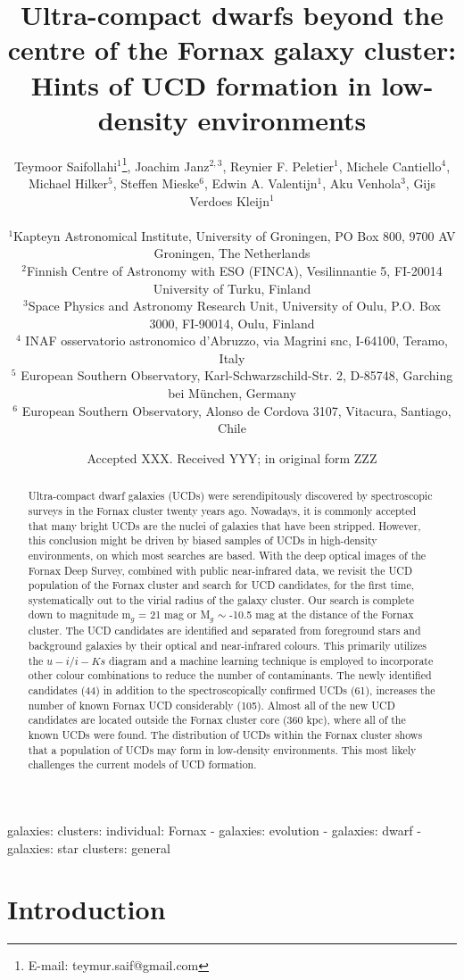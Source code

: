\documentclass[fleqn,usenatbib]{mnras}
\title[UCDs beyond the centre of the Fornax cluster]{Ultra-compact dwarfs beyond the centre of the Fornax galaxy cluster: Hints of UCD formation in low-density environments}
\author[T. Saifollahi et al.]
{Teymoor Saifollahi$^{1}$\thanks{E-mail: teymur.saif@gmail.com},
Joachim Janz$^{2,3}$,
Reynier F. Peletier$^{1}$,
Michele Cantiello$^{4}$,
\newauthor
Michael Hilker$^{5}$,
Steffen Mieske$^{6}$,
Edwin A. Valentijn$^{1}$,
Aku Venhola$^{3}$,
Gijs Verdoes Kleijn$^{1}$
\\\\
$^{1}$Kapteyn Astronomical Institute, University of Groningen, PO Box 800, 9700 AV Groningen, The Netherlands\\
$^{2}$Finnish Centre of Astronomy with ESO (FINCA), Vesilinnantie 5, FI-20014 University of Turku, Finland\\
$^{3}$Space Physics and Astronomy Research Unit, University of Oulu, P.O. Box 3000, FI-90014, Oulu, Finland\\
$^{4}$ INAF osservatorio astronomico d’Abruzzo, via Magrini snc, I-64100, Teramo, Italy \\
$^{5}$ European Southern Observatory, Karl-Schwarzschild-Str. 2, D-85748, Garching bei München, Germany \\
$^{6}$ European Southern Observatory, Alonso de Cordova 3107, Vitacura, Santiago, Chile \\
}
\date{Accepted XXX. Received YYY; in original form ZZZ}
\begin{document}
\label{firstpage}
\pagerange{\pageref{firstpage}--\pageref{lastpage}}
\maketitle

\begin{abstract}
Ultra-compact dwarf galaxies (UCDs) were serendipitously discovered by spectroscopic surveys in the Fornax cluster twenty years ago. Nowadays, it is commonly accepted that many bright UCDs are the nuclei of galaxies that have been stripped. However, this conclusion might be driven by biased samples of UCDs in high-density environments, on which most searches are based. With the deep optical images of the Fornax Deep Survey, combined with public near-infrared data, we revisit the UCD population of the Fornax cluster and search for UCD candidates, for the first time, systematically out to the virial radius of the galaxy cluster. Our search is complete down to magnitude m$_g$ = 21 mag or M$_g$ $\sim$ -10.5 mag at the distance of the Fornax cluster. The UCD candidates are identified and separated from foreground stars and background galaxies by their optical and near-infrared colours. This primarily utilizes the $u-i$/$i-Ks$ diagram and a machine learning technique is employed to incorporate other colour combinations to reduce the number of contaminants. The newly identified candidates (44) in addition to the spectroscopically confirmed UCDs (61), increases the number of known Fornax UCD considerably (105). Almost all of the new UCD candidates are located outside the Fornax cluster core (360 kpc), where all of the known UCDs were found. The distribution of UCDs within the Fornax cluster shows that a population of UCDs may form in low-density environments. This most likely challenges the current models of UCD formation.

\end{abstract}

\begin{keywords}
galaxies: clusters: individual: Fornax - galaxies: evolution - galaxies: dwarf - galaxies: star clusters: general
\end{keywords}



\section{Introduction}
\end{document}
